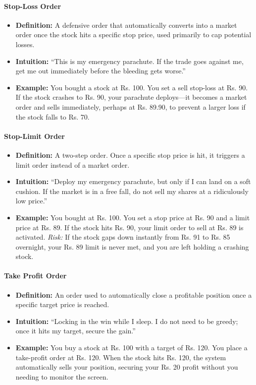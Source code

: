 \documentclass[12pt,openany]{book}
\begin{document}
\paragraph{Stop-Loss Order}
\begin{itemize}[leftmargin=*]
    \item \textbf{Definition:} A defensive order that automatically converts into a market order once the stock hits a specific stop price, used primarily to cap potential losses.
    \item \textbf{Intuition:} ``This is my emergency parachute. If the trade goes against me, get me out immediately before the bleeding gets worse.''
    \item \textbf{Example:} You bought a stock at Rs. 100. You set a sell stop-loss at Rs. 90. If the stock crashes to Rs. 90, your parachute deploys---it becomes a market order and sells immediately, perhaps at Rs. 89.90, to prevent a larger loss if the stock falls to Rs. 70.
\end{itemize}

\paragraph{Stop-Limit Order}
\begin{itemize}[leftmargin=*]
    \item \textbf{Definition:} A two-step order. Once a specific stop price is hit, it triggers a limit order instead of a market order.
    \item \textbf{Intuition:} ``Deploy my emergency parachute, but only if I can land on a soft cushion. If the market is in a free fall, do not sell my shares at a ridiculously low price.''
    \item \textbf{Example:} You bought at Rs. 100. You set a stop price at Rs. 90 and a limit price at Rs. 89. If the stock hits Rs. 90, your limit order to sell at Rs. 89 is activated. \emph{Risk:} If the stock gaps down instantly from Rs. 91 to Rs. 85 overnight, your Rs. 89 limit is never met, and you are left holding a crashing stock.
\end{itemize}

\paragraph{Take Profit Order}
\begin{itemize}[leftmargin=*]
    \item \textbf{Definition:} An order used to automatically close a profitable position once a specific target price is reached.
    \item \textbf{Intuition:} ``Locking in the win while I sleep. I do not need to be greedy; once it hits my target, secure the gain.''
    \item \textbf{Example:} You buy a stock at Rs. 100 with a target of Rs. 120. You place a take-profit order at Rs. 120. When the stock hits Rs. 120, the system automatically sells your position, securing your Rs. 20 profit without you needing to monitor the screen.
\end{itemize}
\end{document}
